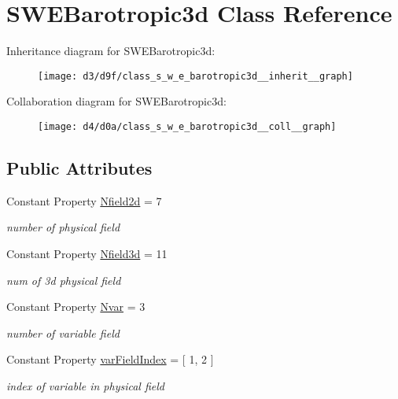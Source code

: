 \hypertarget{class_s_w_e_barotropic3d}{}\section{S\+W\+E\+Barotropic3d Class Reference}
\label{class_s_w_e_barotropic3d}


Inheritance diagram for S\+W\+E\+Barotropic3d\+:
\nopagebreak
\begin{figure}[H]
\begin{center}
\leavevmode
\texttt{[image: d3/d9f/class\_s\_w\_e\_barotropic3d\_\_inherit\_\_graph]}
\end{center}
\end{figure}


Collaboration diagram for S\+W\+E\+Barotropic3d\+:
\nopagebreak
\begin{figure}[H]
\begin{center}
\leavevmode
\texttt{[image: d4/d0a/class\_s\_w\_e\_barotropic3d\_\_coll\_\_graph]}
\end{center}
\end{figure}
\subsection*{Public Attributes}
\begin{DoxyCompactItemize}
\item 
Constant Property \hyperlink{class_s_w_e_barotropic3d_a0e2d21ce5077dd1c3b3b27ba1bf950ba}{Nfield2d} = 7
\begin{DoxyCompactList}\small\item\em number of physical field \end{DoxyCompactList}\item 
Constant Property \hyperlink{class_s_w_e_barotropic3d_a928fbe7d858df4427465bedf17665c17}{Nfield3d} = 11
\begin{DoxyCompactList}\small\item\em num of 3d physical field \end{DoxyCompactList}\item 
Constant Property \hyperlink{class_s_w_e_barotropic3d_ab4e4bec9c64f491ed5b3723e51867c2b}{Nvar} = 3
\begin{DoxyCompactList}\small\item\em number of variable field \end{DoxyCompactList}\item 
Constant Property \hyperlink{class_s_w_e_barotropic3d_a9e793f738add903d602ff5a9508cdb82}{var\+Field\+Index} = \mbox{[} 1, 2 \mbox{]}
\begin{DoxyCompactList}\small\item\em index of variable in physical field \end{DoxyCompactList}\end{DoxyCompactItemize}
